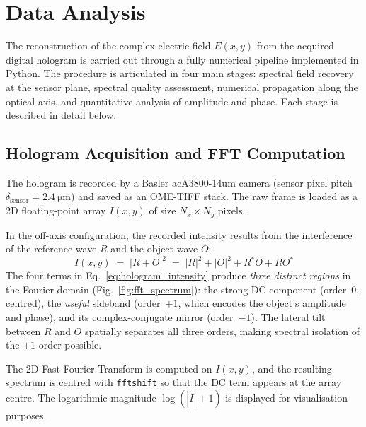 
\section{Data Analysis}

The reconstruction of the complex electric field $E(x,y)$ from the acquired digital hologram
is carried out through a fully numerical pipeline implemented in Python.
The procedure is articulated in four main stages:
spectral field recovery at the sensor plane,
spectral quality assessment,
numerical propagation along the optical axis,
and quantitative analysis of amplitude and phase.
Each stage is described in detail below.

\subsection{Hologram Acquisition and FFT Computation} %

The hologram is recorded by a Basler acA3800-14um camera (sensor pixel pitch
$\delta_\text{sensor} = \SI{2.4}{\micro\meter}$) and saved as an OME-TIFF stack.
The raw frame is loaded as a 2D floating-point array $I(x,y)$ of size
$N_x \times N_y$ pixels.

In the off-axis configuration, the recorded intensity results from the
interference of the reference wave $R$ and the object wave $O$:
\begin{equation}
    I(x,y) \;=\; |R + O|^2
            \;=\; |R|^2 + |O|^2 + R^*O + RO^*
    \label{eq:hologram_intensity}
\end{equation}
The four terms in Eq.~\eqref{eq:hologram_intensity} produce
\textit{three distinct regions} in the Fourier domain
(Fig.~\ref{fig:fft_spectrum}):
the strong DC component (order~0, centred), the \textit{useful} sideband
(order~$+1$, which encodes the object's amplitude and phase), and its
complex-conjugate mirror (order~$-1$).
The lateral tilt between $R$ and $O$ spatially separates all three orders,
making spectral isolation of the $+1$ order possible.

The 2D Fast Fourier Transform is computed on $I(x,y)$, and the resulting
spectrum is centred with \texttt{fftshift} so that the DC term appears at
the array centre.
The logarithmic magnitude $\log(|\tilde{I}|+1)$ is displayed for
visualisation purposes.

